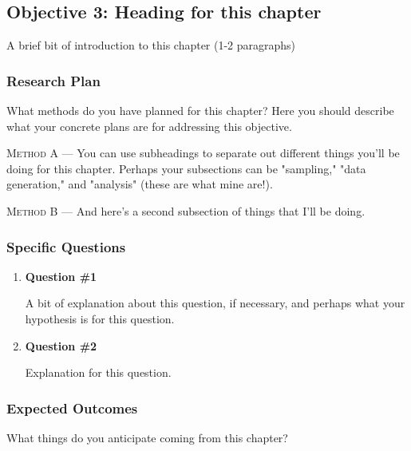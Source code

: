 \subsection{Objective 3: Heading for this chapter}
\label{objective3}
A brief bit of introduction to this chapter (1-2 paragraphs)

\subsubsection{Research Plan}
 What methods do you have planned for this chapter? Here you should describe what your concrete plans are for addressing this objective.
 
 \textsc{Method A ---} You can use subheadings to separate out different things you'll be doing for this chapter. Perhaps your subsections can be "sampling," "data generation," and "analysis" (these are what mine are!).
 
 \textsc{Method B ---} And here's a second subsection of things that I'll be doing.
 
\subsubsection{Specific Questions}
\begin{enumerate}
    \item \textbf{Question \#1}
    
    A bit of explanation about this question, if necessary, and perhaps what your hypothesis is for this question.
    
    \item \textbf{Question \#2}
    
    Explanation for this question.
    
\end{enumerate}

\subsubsection{Expected Outcomes}
What things do you anticipate coming from this chapter?